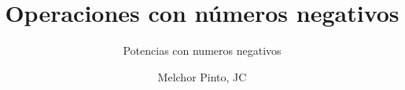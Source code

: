 \documentclass{guia}
\title{Operaciones con números negativos}
\subtitle{Potencias con numeros negativos}
\author{Melchor Pinto, JC}
\begin{document}
%
\begin{questions}
\questionboxed{}
\end{questions}
\end{document}

